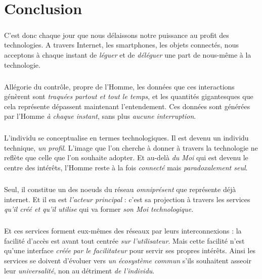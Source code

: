 \chapter{Conclusion}

\paragraph{} C'est donc chaque jour que nous délaissons notre puissance au profit des
technologies. A travers Internet, les smartphones, les objets connectés, nous acceptons
à chaque instant de \emph{léguer} et de \emph{déléguer} une part de nous-même à la 
technologie. 

\paragraph{} Allégorie du contrôle, propre de l'Homme, les données que ces
interactions génèrent sont \emph{traquées partout et tout le temps}, et les quantités
gigantesques que cela représente dépassent maintenant l'entendement. Ces données sont
générées par l'Homme \emph{à chaque instant}, sans plus \emph{aucune interruption}. 

\paragraph{} L'individu se conceptualise en termes technologiques. Il est devenu un
individu technique, \emph{un profil}. L'image que l'on cherche à donner à travers la
technologie ne reflète que celle que l'on souhaite adopter. Et au-delà \emph{du Moi}
qui est devenu le centre des intérêts, l'Homme reste à la fois \emph{connecté} mais
\emph{paradoxalement seul}.

\paragraph{} Seul, il constitue un des noeuds du réseau \emph{omniprésent} que représente
déjà internet. Et il en est \emph{l'acteur principal} : c'est sa projection à travers
les services \emph{qu'il créé et qu'il utilise} qui va former \emph{son Moi technologique}.

\paragraph{} Et ces services forment eux-mêmes des réseaux par leurs interconnexions : la facilité
d'accès est avant tout centrée \emph{sur l'utilisateur}. Mais cette facilité n'est qu'une interface
\emph{créée par le facilitateur} pour servir ses propres intérêts. Ainsi les services se doivent
d'évoluer vers \emph{un écosystème commun} s'ils souhaitent asseoir leur \emph{universalité},
non au détriment \emph{de l'individu}. 

